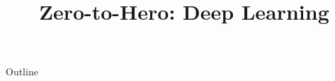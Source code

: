 \documentclass[xcolor=dvipsnames,compress,t,pdf,9pt]{beamer}
\title[\insertframenumber /\inserttotalframenumber]{Zero-to-Hero: Deep Learning}
\begin{document}
	\begin{frame}
	\titlepage
	\end{frame}
	
	\begin{frame}{Outline}
	    \tableofcontents
	\end{frame}

	
	
	
	
\end{document}
